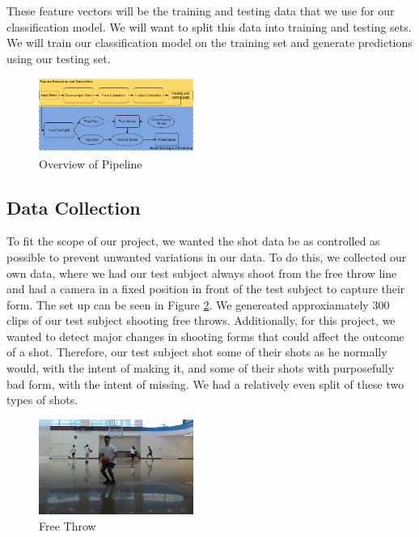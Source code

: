 \documentclass[10pt,twocolumn,letterpaper]{article}
\begin{document}
These feature vectors will be the training and testing data that we use for our classification model. We will want to split this data into training
and testing sets. We will train our classification model on the training set and generate predictions using our testing set.
\begin{figure}[h]
  \centering
  \includegraphics[width=0.45\textwidth]{imgs/cv_pipeline_real.png}
  \caption{Overview of Pipeline}
  \label{fig:flowchart}
\end{figure}

\subsection{Data Collection}
To fit the scope of our project, we wanted the shot data be as controlled as possible to prevent unwanted variations
in our data. To do this, we collected our own data, where we had our test subject always shoot from the free throw line
and had a camera in a fixed position in front of the test subject to capture their form. The set up can be seen in Figure \ref{fig:ft_data}.
We genereated approxiamately 300 clips of our test subject shooting free throws. Additionally, for this project, we wanted to detect major changes
in shooting forms that could affect the outcome of a shot. Therefore, our test subject shot some of their shots as he normally would, with the intent
of making it, and some of their shots with purposefully bad form, with the intent of missing. We had a relatively even split of these two types of shots. 

\begin{figure}
  \centering
  \includegraphics[width=0.45\textwidth]{imgs/data_collection.png}
  \caption{Free Throw}
  \label{fig:ft_data}
\end{figure}
\end{document}
